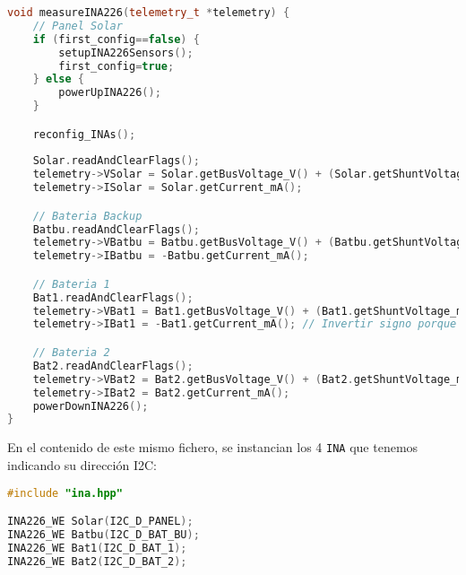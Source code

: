 \begin{itemize}
\begin{lstlisting}[captionpos=b, caption={Codigo funcion measureINA226}, language=c++]
void measureINA226(telemetry_t *telemetry) {
    // Panel Solar
    if (first_config==false) {
        setupINA226Sensors();
        first_config=true;
    } else {
        powerUpINA226();  
    }

    reconfig_INAs();
    
    Solar.readAndClearFlags();
    telemetry->VSolar = Solar.getBusVoltage_V() + (Solar.getShuntVoltage_mV() / 100);
    telemetry->ISolar = Solar.getCurrent_mA();

    // Bateria Backup
    Batbu.readAndClearFlags();
    telemetry->VBatbu = Batbu.getBusVoltage_V() + (Batbu.getShuntVoltage_mV() / 100);
    telemetry->IBatbu = -Batbu.getCurrent_mA();

    // Bateria 1
    Bat1.readAndClearFlags();
    telemetry->VBat1 = Bat1.getBusVoltage_V() + (Bat1.getShuntVoltage_mV() / 100);
    telemetry->IBat1 = -Bat1.getCurrent_mA(); // Invertir signo porque esta al reves

    // Bateria 2
    Bat2.readAndClearFlags();
    telemetry->VBat2 = Bat2.getBusVoltage_V() + (Bat2.getShuntVoltage_mV() / 100);
    telemetry->IBat2 = Bat2.getCurrent_mA();
    powerDownINA226();
}
\end{lstlisting}

En el contenido de este mismo fichero, se instancian los 4 \texttt{INA} que tenemos indicando su dirección I2C:

\begin{lstlisting}[captionpos=b, caption={Instancia de las direcciones de los \texttt{INA}.}, language=c++]
#include "ina.hpp"

INA226_WE Solar(I2C_D_PANEL);
INA226_WE Batbu(I2C_D_BAT_BU);
INA226_WE Bat1(I2C_D_BAT_1);
INA226_WE Bat2(I2C_D_BAT_2);
\end{lstlisting}

\end{itemize}
